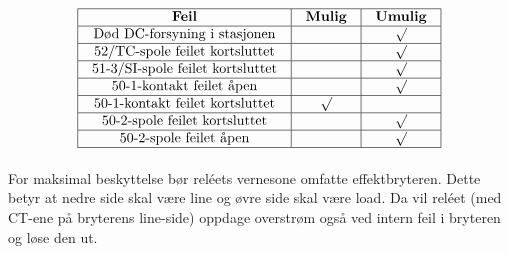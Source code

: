 

$$\vbox{\offinterlineskip
\halign{\strut
\vrule \quad\hfil # \ \hfil & 
\vrule \quad\hfil # \ \hfil & 
\vrule \quad\hfil # \ \hfil \vrule \cr
\noalign{\hrule}
%
{\bf Feil} & {\bf Mulig} & {\bf Umulig} \cr
%
\noalign{\hrule}
%
Død DC-forsyning i stasjonen &  & $\surd$ \cr
%
\noalign{\hrule}
%
52/TC-spole feilet kortsluttet &  & $\surd$ \cr
%
\noalign{\hrule}
%
51-3/SI-spole feilet kortsluttet &  & $\surd$ \cr
%
\noalign{\hrule}
%
50-1-kontakt feilet åpen &  & $\surd$ \cr
%
\noalign{\hrule}
%
50-1-kontakt feilet kortsluttet & $\surd$ &  \cr
%
\noalign{\hrule}
%
50-2-spole feilet kortsluttet &  & $\surd$ \cr
%
\noalign{\hrule}
%
50-2-spole feilet åpen &  & $\surd$ \cr
%
\noalign{\hrule}
} %
}$$ %

For maksimal beskyttelse bør reléets vernesone omfatte effektbryteren. Dette betyr at nedre side skal være line og øvre side skal være load. Da vil reléet (med CT-ene på bryterens line-side) oppdage overstrøm også ved intern feil i bryteren og løse den ut.



